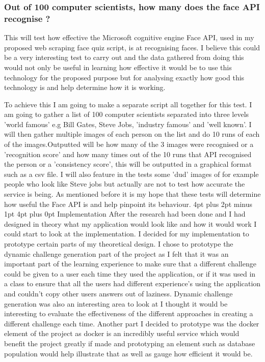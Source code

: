 \documentclass[12pt,a4paper]{article}
\makeatletter
\renewcommand\section{\@startsection {section}{1}{0mm} %
                               {4pt plus 2pt minus 1pt} %
                               {4pt plus 0pt} %
                               {\bfseries}}
\makeatother
\begin{document}
\subsubsection{Out of 100 computer scientists, how many does the face API recognise ?} 
This will test how effective the Microsoft cognitive engine Face API, used in my proposed web scraping face quiz script, is at recognising faces.  I believe this could be a very interesting test to carry out and the data gathered from doing this would not only be useful in learning how effective it would be to use this technology for the proposed purpose but for analysing exactly how good this technology is and help determine how it is working. 

To achieve this I am going to make a separate script all together for this test. I am going to gather a list of 100 computer scientists separated into three levels 'world famous' e.g Bill Gates, Steve Jobs, 'industry famous' and 'well known'. I will then gather multiple images of each person on the list and do 10 runs of each of the images.Outputted will be how many of the 3 images were recognised or a 'recognition score' and how many times out of the 10 runs that API recognised the person or a 'consistency score', this will be outputted in a graphical format such as a csv file. I will also feature in the tests some 'dud' images of for example people who look like Steve jobs but actually are not to test how accurate the service is being. As mentioned before it is my hope that these tests will determine how useful the Face API is and help pinpoint its behaviour.
\section{Implementation}
After the research had been done and I had designed in theory what my application would look like and how it would work I could start to look at the implementation. I decided for my implementation to prototype certain parts of my theoretical design. I chose to prototype the dynamic challenge generation part of the project as I felt that it was an important part of the learning experience to make sure that a different challenge could be given to a user each time they used the application, or if it was used in a class to ensure that all the users had different experience's using the application and couldn't copy other users answers out of laziness. Dynamic challenge generation was also an interesting area to look at I thought it would be interesting to evaluate the effectiveness of the different approaches in creating a different challenge each time. Another part I decided to prototype was the docker element of the project as docker is an incredibly useful service which would benefit the project greatly if made and prototyping an element such as database population would help illustrate that as well as gauge how efficient it would be.  
\end{document}
